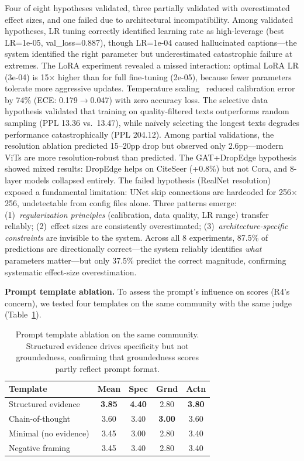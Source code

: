 \documentclass[conference]{IEEEtran}
\begin{document}
Four of eight hypotheses validated, three partially validated with overestimated effect sizes, and one failed due to architectural incompatibility.
Among validated hypotheses, LR tuning correctly identified learning rate as high-leverage (best LR=1e-05, val\_loss=0.887), though LR=1e-04 caused hallucinated captions---the system identified the right parameter but underestimated catastrophic failure at extremes.
The LoRA experiment revealed a missed interaction: optimal LoRA LR (3e-04) is 15$\times$ higher than for full fine-tuning (2e-05), because fewer parameters tolerate more aggressive updates.
Temperature scaling~\cite{guo2017calibration} reduced calibration error by 74\% (ECE: 0.179$\to$0.047) with zero accuracy loss.
The selective data hypothesis validated that training on quality-filtered texts outperforms random sampling (PPL 13.36 vs.\ 13.47), while na\"ively selecting the longest texts degrades performance catastrophically (PPL 204.12).
Among partial validations, the resolution ablation predicted 15--20pp drop but observed only 2.6pp---modern ViTs are more resolution-robust than predicted.
The GAT+DropEdge hypothesis showed mixed results: DropEdge helps on CiteSeer (+0.8\%) but not Cora, and 8-layer models collapsed entirely.
The failed hypothesis (RealNet resolution) exposed a fundamental limitation: UNet skip connections are hardcoded for 256$\times$256, undetectable from config files alone.
Three patterns emerge: (1)~\emph{regularization principles} (calibration, data quality, LR range) transfer reliably; (2)~effect sizes are consistently overestimated; (3)~\emph{architecture-specific constraints} are invisible to the system.
Across all 8 experiments, 87.5\% of predictions are directionally correct---the system reliably identifies \emph{what} parameters matter---but only 37.5\% predict the correct magnitude, confirming systematic effect-size overestimation.

\textbf{Prompt template ablation.}
To assess the prompt's influence on scores (R4's concern), we tested four templates on the same community with the same judge (Table~\ref{tab:prompt}).

\begin{table}[t]
\caption{Prompt template ablation on the same community. Structured evidence drives specificity but not groundedness, confirming that groundedness scores partly reflect prompt format.}
\label{tab:prompt}
\centering
\scriptsize
\begin{tabular}{lcccc}
\toprule
\textbf{Template} & \textbf{Mean} & \textbf{Spec} & \textbf{Grnd} & \textbf{Actn} \\
\midrule
Structured evidence & \textbf{3.85} & \textbf{4.40} & 2.80 & \textbf{3.80} \\
Chain-of-thought & 3.60 & 3.40 & \textbf{3.00} & 3.60 \\
Minimal (no evidence) & 3.45 & 3.00 & 2.80 & 3.40 \\
Negative framing & 3.45 & 3.40 & 2.80 & 3.40 \\
\bottomrule
\end{tabular}
\end{table}
\end{document}
